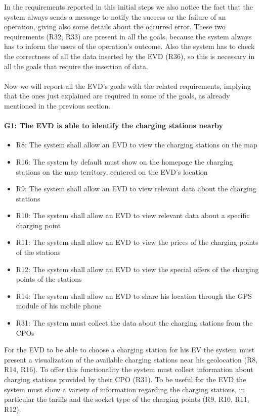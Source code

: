 In the requirements reported in this initial steps we also notice the fact that the system always sends a message to notify the success or the failure of an operation, giving also some details about the occurred error. These two requirements (R32, R33) are present in all the goals, because the system always has to inform the users of the operation's outcome. Also the system has to check the correctness of all the data inserted by the EVD (R36), so this is necessary in all the goals that require the insertion of data.\\\\
Now we will report all the EVD's goals with the related requirements, implying that the ones just explained are required in some of the goals, as already mentioned in the previous section.

\paragraph{G1: The EVD is able to identify the charging stations nearby}
\begin{itemize}
    \item R8: The system shall allow an EVD to view the charging stations on the map
    \item R16: The system by default must show on the homepage the charging stations on the map territory, centered on the EVD's location
    \item R9: The system shall allow an EVD to view relevant data about the charging stations
    \item R10: The system shall allow an EVD to view relevant data about a specific charging point
    \item R11: The system shall allow an EVD to view the prices of the charging points of the stations
    \item R12: The system shall allow an EVD to view the special offers of the charging points of the stations
    \item R14: The system shall allow an EVD to share his location through the GPS module of his mobile phone
    \item R31: The system must collect the data about the charging stations from the CPOs
\end{itemize}
For the EVD to be able to choose a charging station for his EV the system must present a visualization of the available charging stations near his geolocation (R8, R14, R16). To offer this functionality the system must collect information about charging stations provided by their CPO (R31). To be useful for the EVD the system must show a variety of information regarding the charging stations, in particular the tariffs and the socket type of the charging points (R9, R10, R11, R12).

